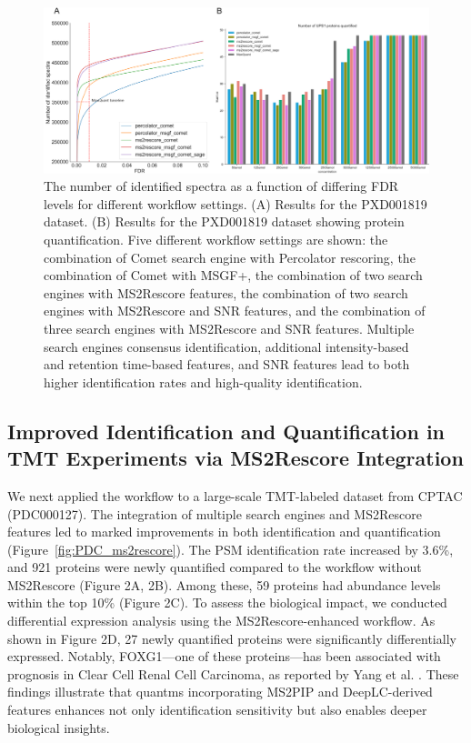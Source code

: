 \documentclass[12pt]{article}
\begin{document}
\begin{figure}[ht!]
	\centering
	\includegraphics[width=1\textwidth]{figures//PXD001819.png}
	\caption{The number of identified spectra as a function of differing FDR levels for different workflow settings. (A) Results for the PXD001819 dataset. (B) Results for the PXD001819 dataset showing protein quantification. Five different workflow settings are shown: the combination of Comet search engine with Percolator rescoring, the combination of Comet with MSGF+, the combination of two search engines with MS2Rescore features, the combination of two search engines with MS2Rescore and SNR features, and the combination of three search engines with MS2Rescore and SNR features. Multiple search engines consensus identification, additional intensity-based and retention time-based features, and SNR features lead to both higher identification rates and high-quality identification.}
	\label{fig:PXD001819_ms2rescore_pic}
\end{figure}

\subsection{Improved Identification and Quantification in TMT Experiments via MS2Rescore Integration}
We next applied the workflow to a large-scale TMT-labeled dataset from CPTAC (PDC000127). The integration of multiple search engines and MS2Rescore features led to marked improvements in both identification and quantification (Figure~\ref{fig:PDC_ms2rescore}). The PSM identification rate increased by 3.6\%, and 921 proteins were newly quantified compared to the workflow without MS2Rescore (Figure 2A, 2B). Among these, 59 proteins had abundance levels within the top 10\% (Figure 2C). To assess the biological impact, we conducted differential expression analysis using the MS2Rescore-enhanced workflow. As shown in Figure 2D, 27 newly quantified proteins were significantly differentially expressed. Notably, FOXG1—one of these proteins—has been associated with prognosis in Clear Cell Renal Cell Carcinoma, as reported by Yang et al. \cite{yang_comprehensive_2022}. These findings illustrate that quantms incorporating MS2PIP and DeepLC-derived features enhances not only identification sensitivity but also enables deeper biological insights.
\end{document}
